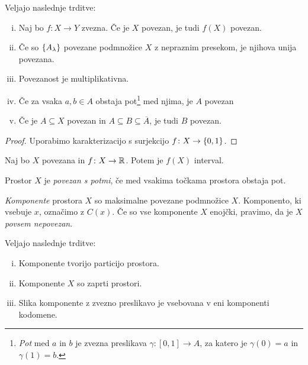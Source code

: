 \begin{izrek}
Veljajo naslednje trditve:

\begin{enumerate}[i)]
\item Naj bo $f \colon X \to Y$ zvezna. Če je $X$ povezan, je tudi
$f(X)$ povezan.
\item Če so $\left\{A_\lambda\right\}$ povezane podmnožice $X$ z nepraznim
presekom, je njihova unija povezana.
\item Povezanost je multiplikativna.
\item Če za vsaka $a, b \in A$ obstaja pot\footnote{\emph{Pot} med
$a$ in $b$ je zvezna preslikava $\gamma \colon [0,1] \to A$, za
katero je $\gamma(0) = a$ in $\gamma(1) = b$.} med njima, je $A$
povezan
\item Če je $A \subseteq X$ povezan in
$A \subseteq B \subseteq \overline{A}$, je tudi $B$ povezan.
\end{enumerate}
\end{izrek}

\begin{proof}
Uporabimo karakterizacijo s surjekcijo $f \colon X \to \left\{0,1\right\}$.
\end{proof}

\begin{izrek}
Naj bo $X$ povezana in $f \colon X \to \mathbb{R}$. Potem je $f(X)$
interval.
\end{izrek}

\obvs

\begin{definicija}
Prostor $X$ je \emph{povezan s potmi}, če med vsakima točkama
prostora obstaja pot.
\end{definicija}

\begin{definicija}
\emph{Komponente}
prostora $X$ so maksimalne povezane podmnožice $X$. Komponento, ki
vsebuje $x$, označimo z $C(x)$. Če so vse komponente $X$ enojčki,
pravimo, da je $X$ \emph{povsem nepovezan}.
\end{definicija}

\begin{izrek}
Veljajo naslednje trditve:

\begin{enumerate}[i)]
\item Komponente tvorijo particijo prostora.
\item Komponente $X$ so zaprti prostori.
\item Slika komponente z zvezno preslikavo je vsebovana v
eni komponenti kodomene.
\end{enumerate}
\end{izrek}

